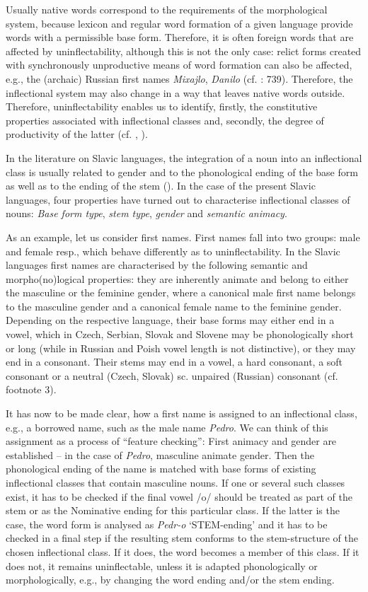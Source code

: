 \documentclass[output=paper]{langscibook}
\begin{document}
Usually native words correspond to the requirements of the morphological system, because lexicon and regular word formation of a given language provide words with a permissible base form. Therefore, it is often foreign words that are affected by uninflectability, although this is not the only case: relict forms created with synchronously unproductive means of word formation can also be affected, e.g., the (archaic) Russian first names \textit{Mixajlo}, \textit{Danilo} (cf. \citealt{Zaliznjak2008}: 739). Therefore, the inflectional system may also change in a way that leaves native words outside. Therefore, uninflectability enables us to identify, firstly, the constitutive properties associated with inflectional classes and, secondly, the degree of productivity of the latter (cf. \citealt{Wurzel1984}, \citealt{Dressler1997,Dressler2003}). 

In the literature on Slavic languages, the integration of a noun into an inflectional class is usually related to gender and to the phonological ending of the base form as well as to the ending of the stem (\citealt{HentschelMenzel2009}). In the case of the present Slavic languages, four properties have turned out to characterise inflectional classes of nouns: \textit{Base form type}, \textit{stem type}, \textit{gender} and \textit{semantic animacy}.

As an example, let us consider first names. First names fall into two groups: male and female resp., which behave differently as to uninflectability. In the Slavic languages first names are characterised by the following semantic and morpho(no)logical properties: they are inherently animate and belong to either the masculine or the feminine gender, where a canonical male first name belongs to the masculine gender and a canonical female name to the feminine gender. Depending on the respective language, their base forms may either end in a vowel, which in Czech, Serbian, Slovak and Slovene may be phonologically short or long (while in Russian and Poish vowel length is not distinctive), or they may end in a consonant. Their stems may end in a vowel, a hard consonant, a soft consonant or a neutral (Czech, Slovak) sc. unpaired (Russian) consonant (cf. footnote 3).

It has now to be made clear, how a first name is assigned to an inflectional class, e.g., a borrowed name, such as the male name \textit{Pedro}. We can think of this assignment as a process of “feature checking”: First animacy and gender are established – in the case of \textit{Pedro}, masculine animate gender. Then the phonological ending of the name is matched with base forms of existing inflectional classes that contain masculine nouns. If one or several such classes exist, it has to be checked if the final vowel /o/ should be treated as part of the stem or as the Nominative ending for this particular class. If the latter is the case, the word form is analysed as \textit{Pedr-o} ‘STEM-ending’ and it has to be checked in a final step if the resulting stem conforms to the stem-structure of the chosen inflectional class. If it does, the word becomes a member of this class. If it does not, it remains uninflectable, unless it is adapted phonologically or morphologically, e.g., by changing the word ending and/or the stem ending. 
\end{document}

